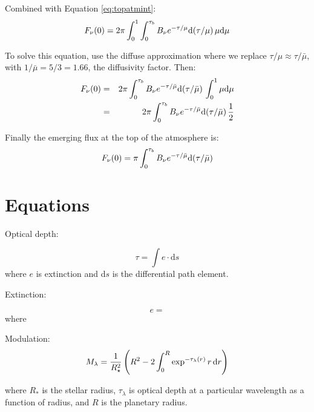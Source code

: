 \documentclass[letterpaper,12pt]{article}
\begin{document}
Combined with Equation \ref{eq:topatmint}:
\begin{equation}
F\sb{\nu}(0) = 2\pi \int\sb{0}\sp{1} \int\sb{0}\sp{\tau\sb{b}} B\sb{\nu}e\sp{-\tau/\mu}\der(\tau/\mu)\, \mu\der\mu
\end{equation}

To solve this equation, use the diffuse approximation where we
replace $\tau/\mu \approx \tau/\bar{\mu}$, with $1/\bar{\mu} = 5/3 =
1.66$, the diffusivity factor.  Then:
\begin{eqnarray}
F\sb{\nu}(0) & = & 2\pi \int\sb{0}\sp{\tau\sb{b}} B\sb{\nu}e\sp{-\tau/\bar{\mu}}\der(\tau/\bar{\mu})\, \int\sb{0}\sp{1}\mu\der\mu \\
             & = & 2\pi \int\sb{0}\sp{\tau\sb{b}} B\sb{\nu}e\sp{-\tau/\bar{\mu}}\der(\tau/\bar{\mu})\, \frac{1}{2}
\end{eqnarray}

Finally the emerging flux at the top of the atmosphere is:
\begin{equation}
F\sb{\nu}(0) = \pi \int\sb{0}\sp{\tau\sb{b}} B\sb{\nu}e\sp{-\tau/\bar{\mu}}\der(\tau/\bar{\mu})
\end{equation}

\section{Equations}
\label{sec:equations}
Optical depth:

\begin{equation}
\label{eqn:tau}
\tau = \int e \cdot \mathrm{d}s
\end{equation}
\noindent
where $e$ is extinction and d$s$ is the differential path element. \newline

\noindent
Extinction:

\begin{equation}
\label{eqn:ext}
e = 
\end{equation}
\noindent
where  \newline

\noindent
Modulation:
\begin{equation}
\label{eqn:mod}
M_{\lambda} = \frac{1}{R_\star^2}\left(R^2 - 2\int_{0}^{R} \exp^{-\tau_\lambda(r)} r\,{\rm d}r\right)
\end{equation}

\noindent
where $R_{*}$ is the stellar radius, $\tau_\lambda$ is optical depth at a particular wavelength as a function of radius, and $R$ is the planetary radius. \newline
\end{document}
